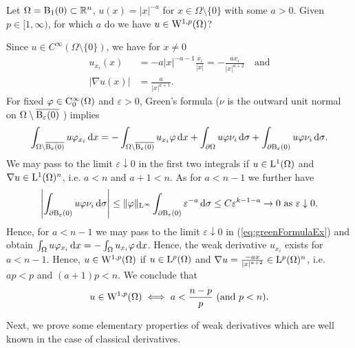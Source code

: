 \begin{ex}
  Let $\Omega = \mathrm{B}_1(0) \subset \mathbb{R}^n$, $u(x) = |x|^{-a}$ for $x \in \Omega \setminus \{0\}$ with some $a > 0$.
  Given $p \in [1,\infty)$, for which $a$ do we have $u \in \mathrm{W}^{1,p}(\Omega)$?

    Since $u \in C^\infty(\Omega \setminus \{0\})$, we have for $x \neq 0$
    \begin{align*}
      u_{x_i}(x) &= -a|x|^{-a-1} \frac{x_i}{|x|} = -\frac{ax_i}{|x|^{a + 2}} \quad \text{and} \\
      |\nabla u(x)| &= \frac{a}{|x|^{a + 1}}.
    \end{align*}
    For fixed $\varphi \in \mathrm{C}_0^\infty(\Omega)$ and $\varepsilon > 0$, Green's formula ($\nu$ is the outward unit normal on $\Omega \setminus \overline{\mathrm{B}_\varepsilon(0)}$ ) implies
    \begin{equation}
      \label{eq:greenFormulaEx}
      \int_{\Omega \setminus \overline{\mathrm{B}_\varepsilon(0)}} u\varphi_{x_i} \, {\operatorname{d}\!{x}}
      = -\int_{\Omega \setminus \overline{\mathrm{B}_\varepsilon(0)}} u_{x_i} \varphi \, {\operatorname{d}\!{x}} + \int_{\partial \Omega} u\varphi \nu_i \, {\operatorname{d}\!{\sigma}}
      + \int_{\partial \mathrm{B}_\varepsilon(0)} u\varphi \nu_i \, {\operatorname{d}\!{\sigma}}.
    \end{equation}
    We may pass to the limit $\varepsilon \downarrow 0$ in the first two integrals if $u \in \mathrm{L}^1(\Omega)$ and $\nabla u \in \mathrm{L}^1(\Omega)^n$, i.e. $a < n$ and $a + 1 < n$.
    As for $a < n - 1$ we further have
    $$
    \left| \int_{\partial \mathrm{B}_\varepsilon(0)} u\varphi \nu_i \, {\operatorname{d}\!{\sigma}} \right|
      \leq \|\varphi\|_{\mathrm{L}^\infty} \int_{\partial \mathrm{B}_\varepsilon(0)} \varepsilon^{-a} \, {\operatorname{d}\!{\sigma}}
      \leq C \varepsilon^{k - 1 - a} \to 0 \text{ as } \varepsilon \downarrow 0.
    $$
    Hence, for $a < n - 1$ we may pass to the limit $\varepsilon \downarrow 0$ in (\ref{eq:greenFormulaEx}) and obtain $\int_\Omega u\varphi_{x_i} \, {\operatorname{d}\!{x}} = - \int_\Omega u_{x_i} \varphi \, {\operatorname{d}\!{x}}$.
    Hence, the weak derivative $u_{x_i}$ exists for $a < n - 1$.
    Hence, $u \in \mathrm{W}^{1,p}(\Omega)$ if $u \in \mathrm{L}^p(\Omega)$ and $\nabla u = \frac{-a x}{|x|^{a + 2}} \in \mathrm{L}^p(\Omega)^n$, i.e. $ap < p$ and $(a + 1)p < n$.
    We conclude that
    $$
    u \in \mathrm{W}^{1,p}(\Omega) \iff a < \frac{n - p}{p} \text{ (and $p < n$)}.
    $$
\end{ex}

Next, we prove some elementary properties of weak derivatives which are well known in the case of classical derivatives.

